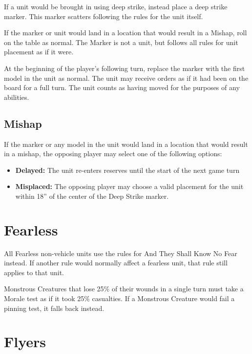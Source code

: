 \documentclass[letterpaper,twocolumn,oneside,titlepage]{book}
\providecommand{\tightlist}{%
  \setlength{\itemsep}{0pt}\setlength{\parskip}{0pt}}
\begin{document}
If a unit would be brought in using deep strike, instead place a deep
strike marker. This marker scatters following the rules for the unit
itself.

If the marker or unit would land in a location that would result in a
Mishap, roll on the table as normal. The Marker is not a unit, but
follows all rules for unit placement as if it were.

At the beginning of the player's following turn, replace the marker with
the first model in the unit as normal. The unit may receive orders as if
it had been on the board for a full turn. The unit counts as having
moved for the purposes of any abilities.

\subsection{\texorpdfstring{\textbf{Mishap}}{Mishap}}\label{mishap}

If the marker or any model in the unit would land in a location that
would result in a mishap, the opposing player may select one of the
following options:

\begin{itemize}
\tightlist
\item
  \textbf{Delayed:} The unit re-enters reserves until the start of the
  next game turn\\
\item
  \textbf{Misplaced:} The opposing player may choose a valid placement
  for the unit within 18'' of the center of the Deep Strike marker.
\end{itemize}

\section{\texorpdfstring{\textbf{Fearless}}{Fearless}}\label{fearless}

All Fearless non-vehicle units use the rules for And They Shall Know No
Fear instead. If another rule would normally affect a fearless unit,
that rule still applies to that unit.

Monstrous Creatures that lose 25\% of their wounds in a single turn must
take a Morale test as if it took 25\% casualties. If a Monstrous
Creature would fail a pinning test, it falls back instead.

\section{\texorpdfstring{\textbf{Flyers}}{Flyers}}\label{flyers}
\end{document}
